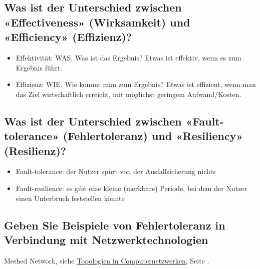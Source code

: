 \subsection*{Was ist der Unterschied zwischen «Effectiveness» (Wirksamkeit) und «Efficiency» (Effizienz)?}
\begin{itemize}
    \item Effektivität: WAS. Was ist das Ergebnis? Etwas ist effektiv, wenn es zum Ergebnis führt.
    \item Effizienz: WIE. Wie kommt man zum Ergebnis? Etwas ist effizient, wenn man das Ziel wirtschaftlich erreicht, mit möglichst geringem Aufwand/Kosten.
\end{itemize}

\subsection*{Was ist der Unterschied zwischen «Fault-tolerance» (Fehlertoleranz) und «Resiliency» (Resilienz)?}
\begin{itemize}
    \item Fault-tolerance: der Nutzer spürt von der Ausfallsicherung nichts
    \item Fault-resilience: es gibt eine kleine (merkbare) Periode, bei dem der Nutzer einen Unterbruch feststellen könnte
\end{itemize}

\subsection*{Geben Sie Beispiele von Fehlertoleranz in Verbindung mit Netzwerktechnologien}
Meshed Network, siehe \underline{\hyperref[sub:Topologies]{Topologien in Computernetzwerken}}, Seite \pageref{sub:Topologies}.

